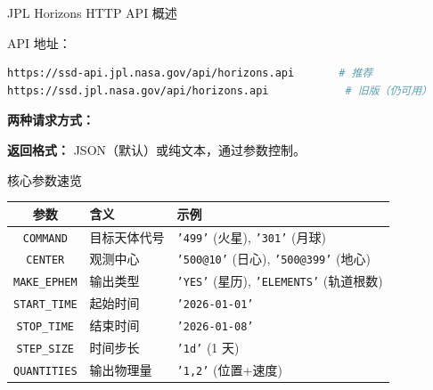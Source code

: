 \documentclass[aspectratio=169]{ctexbeamer}
\begin{document}
\begin{frame}{JPL Horizons HTTP API 概述}
\small

API 地址：

\begin{lstlisting}[language=bash]
https://ssd-api.jpl.nasa.gov/api/horizons.api       # 推荐
https://ssd.jpl.nasa.gov/api/horizons.api            # 旧版（仍可用）
\end{lstlisting}

\vspace{0.15cm}

\textbf{两种请求方式：}

\begin{center}
\end{center}

\vspace{0.15cm}

\textbf{返回格式：} JSON（默认）或纯文本，通过参数控制。

\vspace{0.15cm}

\begin{block}{核心参数速览}
\small
\begin{tabular}{c|l|l}
\toprule
\textbf{参数} & \textbf{含义} & \textbf{示例} \\
\midrule
\texttt{COMMAND} & 目标天体代号 & \texttt{'499'} (火星), \texttt{'301'} (月球) \\
\texttt{CENTER}  & 观测中心       & \texttt{'500@10'} (日心), \texttt{'500@399'} (地心) \\
\texttt{MAKE\_EPHEM} & 输出类型   & \texttt{'YES'} (星历), \texttt{'ELEMENTS'} (轨道根数) \\
\texttt{START\_TIME} & 起始时间    & \texttt{'2026-01-01'} \\
\texttt{STOP\_TIME}  & 结束时间    & \texttt{'2026-01-08'} \\
\texttt{STEP\_SIZE}  & 时间步长    & \texttt{'1d'} (1 天) \\
\texttt{QUANTITIES}  & 输出物理量  & \texttt{'1,2'} (位置+速度) \\
\bottomrule
\end{tabular}
\end{block}
\end{frame}
\end{document}
